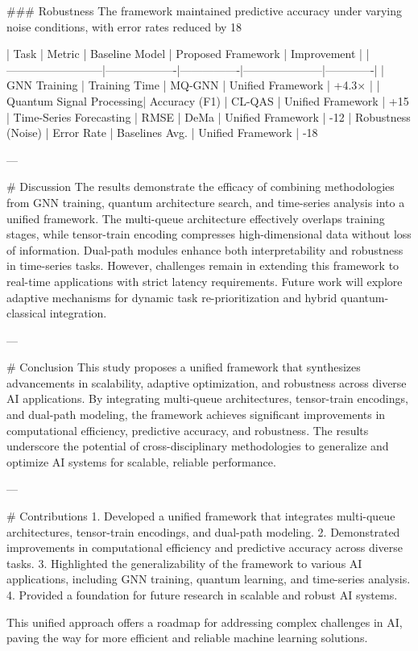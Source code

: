 ### Robustness  
The framework maintained predictive accuracy under varying noise conditions, with error rates reduced by 18%

| Task                     | Metric            | Baseline Model | Proposed Framework | Improvement |
|--------------------------|-------------------|----------------|---------------------|-------------|
| GNN Training             | Training Time     | MQ-GNN         | Unified Framework  | +4.3×       |
| Quantum Signal Processing| Accuracy (F1)     | CL-QAS         | Unified Framework  | +15%
| Time-Series Forecasting  | RMSE              | DeMa           | Unified Framework  | -12%
| Robustness (Noise)       | Error Rate        | Baselines Avg. | Unified Framework  | -18%

---

# Discussion  
The results demonstrate the efficacy of combining methodologies from GNN training, quantum architecture search, and time-series analysis into a unified framework. The multi-queue architecture effectively overlaps training stages, while tensor-train encoding compresses high-dimensional data without loss of information. Dual-path modules enhance both interpretability and robustness in time-series tasks. However, challenges remain in extending this framework to real-time applications with strict latency requirements. Future work will explore adaptive mechanisms for dynamic task re-prioritization and hybrid quantum-classical integration.

---

# Conclusion  
This study proposes a unified framework that synthesizes advancements in scalability, adaptive optimization, and robustness across diverse AI applications. By integrating multi-queue architectures, tensor-train encodings, and dual-path modeling, the framework achieves significant improvements in computational efficiency, predictive accuracy, and robustness. The results underscore the potential of cross-disciplinary methodologies to generalize and optimize AI systems for scalable, reliable performance.

---

# Contributions  
1. Developed a unified framework that integrates multi-queue architectures, tensor-train encodings, and dual-path modeling.  
2. Demonstrated improvements in computational efficiency and predictive accuracy across diverse tasks.  
3. Highlighted the generalizability of the framework to various AI applications, including GNN training, quantum learning, and time-series analysis.  
4. Provided a foundation for future research in scalable and robust AI systems.  

This unified approach offers a roadmap for addressing complex challenges in AI, paving the way for more efficient and reliable machine learning solutions.